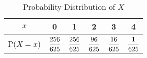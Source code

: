 \documentclass[journal,12pt,twocolumn]{IEEEtran}
\newcommand\T{\rule{0pt}{2.6ex}}       %
\begin{document}
\begin{enumerate}[label=13.\arabic{enumi}.\arabic{enumii}]
	\begin{table}[h!]
	\normalsize
	\centering
			\begin{tabular}[20pt]{|>{}c|a|a|a|a|a|} \hline
			$x$&0&1&2&3&4 \T \\ \hline
			P($X=x$)&$\cfrac{256}{625}$&$\cfrac{256}{625}$&$\cfrac{96}{625}$&$\cfrac{16}{625}$&$\cfrac{1}{625}$\\[1.5ex] \hline
		\end{tabular}\\[2ex]
		\caption{Probability Distribution of $X$}
	\end{table}\\
\end{enumerate}
\end{document}
